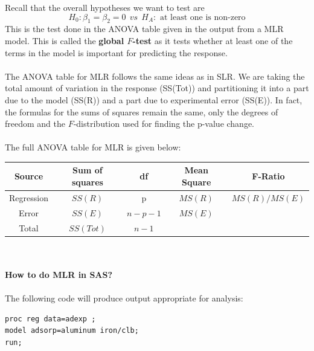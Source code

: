 \newpage

Recall that the overall hypotheses we want to test are
$$H_0: \beta_1=\beta_2=0 ~~vs~~H_A: \text{ at least one is non-zero}$$
This is the test done in the ANOVA table given in the output from a MLR model.  This is called the \textbf{global $F$-test} as it tests whether at least one of the terms in the model is important for predicting the response.\\~\\

The ANOVA table for MLR follows the same ideas as in SLR.  We are taking the total amount of variation in the response (SS(Tot)) and partitioning it into a part due to the model (SS(R)) and a part due to experimental error (SS(E)).  In fact, the formulas for the sums of squares remain the same, only the degrees of freedom and the $F$-distribution used for finding the p-value change.\\~\\

The full ANOVA table for MLR is given below:\\
\begin{tabular}{|c|c|c|c|c|} \hline
Source & Sum of squares & df & Mean Square & F-Ratio \\ \hline
Regression & $SS(R)$ & p & $MS(R)$ & $MS(R)/MS(E)$ \\
Error & $SS(E)$ & $n-p-1$ & $MS(E)$ &  \\
Total & $SS(Tot)$ & $n-1$ & &  \\ \hline
\end{tabular}
~\\~\\
\textbf{How to do MLR in SAS?}\\~\\
The following code will produce output appropriate for analysis:
\begin{small}
\begin{verbatim}
proc reg data=adexp ;
model adsorp=aluminum iron/clb;
run;
\end{verbatim}
\end{small}

